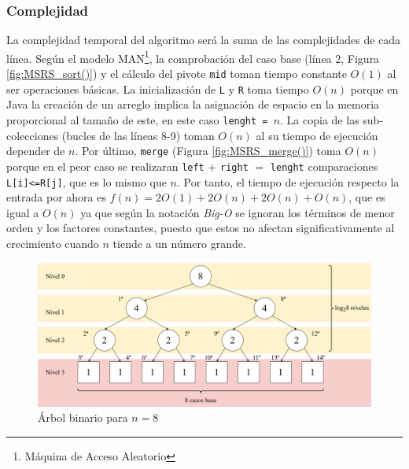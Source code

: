 \documentclass[titlepage]{article}
\begin{document}
\subsubsection{Complejidad}
La complejidad temporal del algoritmo será la suma de las complejidades de cada línea. Según el modelo MAN\footnote{Máquina de Acceso Aleatorio}, la comprobación del caso base (línea 2, Figura \ref{fig:MSRS_sort()}) y el cálculo del pivote \lstinline{mid} toman tiempo constante \(O(1)\) al ser operaciones básicas. La inicialización de \lstinline{L} y \lstinline{R} toma tiempo \(O(n)\) porque en Java la creación de un arreglo implica la asignación de espacio en la memoria proporcional al tamaño de este, en este caso \lstinline{lenght = }\(n\). La copia de las sub-colecciones (bucles de las líneas 8-9) toman \(O(n)\) al su tiempo de ejecución depender de \(n\). Por último, \lstinline{merge} (Figura \ref{fig:MSRS_merge()}) toma \(O(n)\) porque en el peor caso se realizaran \lstinline{left} \(+\) \lstinline{right} \(=\) \lstinline{lenght} comparaciones \lstinline{L[i]<=R[j]}, que es lo mismo que \(n\). Por tanto, el tiempo de ejecución respecto la entrada por ahora es \(f(n) = 2O(1) + 2O(n) + 2O(n)+ O(n)\), que es igual a \(O(n)\) ya que según la notación \textit{Big-O} se ignoran los términos de menor orden y los factores constantes, puesto que estos no afectan significativamente al crecimiento cuando \(n\) tiende a un número grande.

\begin{figure}[hbtp]
    \centering
    \includegraphics[width=0.8\linewidth]{Diagrames/arbolBinarioMSRSn8.png}
    \caption{Árbol binario para \(n=8\)}
    \label{fig:arbol-MSRS-N=8}
\end{figure}
\end{document}

